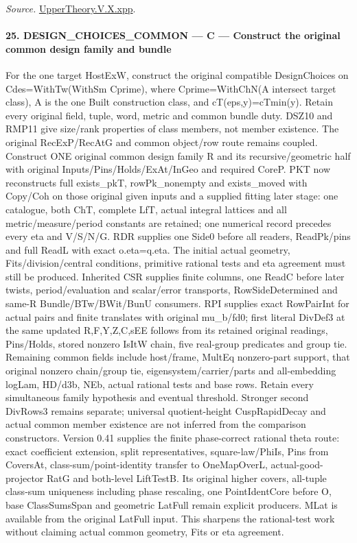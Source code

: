 \documentclass[11pt,a4paper]{article}
\numberwithin{equation}{section}
\theoremstyle{remark}\newtheorem{remark}[theorem]{Remark}
\begin{document}
\emph{Source.} \href{https://github.com/CocoSgt/riemann-hypothesis-lean/blob/7cbf7a0c32fca1badf05931879a37c3f8a2b03b4/src/Development/AutomorphicArithmetic/AutomorphicVarieties/LevelCohomology/Xpp.lean#L11-L84}{UpperTheory.V.X.xpp}.



\paragraph{25. DESIGN\_\allowbreak CHOICES\_\allowbreak COMMON — C — Construct the original common design family and bundle}

For the one target HostExW, construct the original compatible DesignChoices on Cdes=WithTw(WithSm Cprime), where Cprime=WithChN(A intersect target class), A is the one Built construction class, and cT(eps,y)=cTmin(y). Retain every original field, tuple, word, metric and common bundle duty. DSZ10 and RMP11 give size/rank properties of class members, not member existence. The original RecExP/RecAtG and common object/row route remains coupled. Construct ONE original common design family R and its recursive/geometric half with original Inputs/Pins/Holds/ExAt/InGeo and required CoreP. PKT now reconstructs full exists\_\allowbreak pkT, rowPk\_\allowbreak nonempty and exists\_\allowbreak moved with Copy/Coh on those original given inputs and a supplied fitting later stage: one catalogue, both ChT, complete LfT, actual integral lattices and all metric/measure/period constants are retained; one numerical record precedes every eta and V/S/N/G. RDR supplies one Side0 before all readers, ReadPk/pins and full ReadL with exact o.eta=q.eta. The initial actual geometry, Fits/division/central conditions, primitive rational tests and eta agreement must still be produced. Inherited CSR supplies finite columns, one ReadC before later twists, period/evaluation and scalar/error transports, RowSideDetermined and same-R Bundle/BTw/BWit/BunU consumers. RPI supplies exact RowPairInt for actual pairs and finite translates with original mu\_\allowbreak b/fd0; first literal DivDef3 at the same updated R,F,Y,Z,C,sEE follows from its retained original readings, Pins/Holds, stored nonzero IsItW chain, five real-group predicates and group tie. Remaining common fields include host/frame, MultEq nonzero-part support, that original nonzero chain/group tie, eigensystem/carrier/parts and all-embedding logLam, HD/d3b, NEb, actual rational tests and base rows. Retain every simultaneous family hypothesis and eventual threshold. Stronger second DivRows3 remains separate; universal quotient-height CuspRapidDecay and actual common member existence are not inferred from the comparison constructors. Version 0.41 supplies the finite phase-correct rational theta route: exact coefficient extension, split representatives, square-law/PhiIs, Pins from CoversAt, class-sum/point-identity transfer to OneMapOverL, actual-good-projector RatG and both-level LiftTestB. Its original higher covers, all-tuple class-sum uniqueness including phase rescaling, one PointIdentCore before O, base ClassSumsSpan and geometric LatFull remain explicit producers. MLat is available from the original LatFull input. This sharpens the rational-test work without claiming actual common geometry, Fits or eta agreement.
\end{document}
